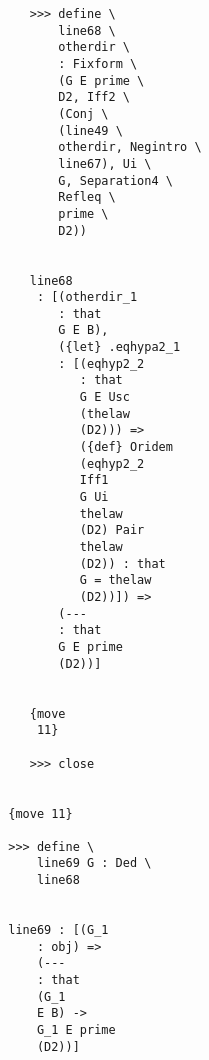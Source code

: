 \documentclass[12pt]{article}
\begin{document}
\begin{verbatim}
                                    >>> define \
                                        line68 \
                                        otherdir \
                                        : Fixform \
                                        (G E prime \
                                        D2, Iff2 \
                                        (Conj \
                                        (line49 \
                                        otherdir, Negintro \
                                        line67), Ui \
                                        G, Separation4 \
                                        Refleq \
                                        prime \
                                        D2))


                                    line68 
                                     : [(otherdir_1 
                                        : that 
                                        G E B), 
                                        ({let} .eqhypa2_1 
                                        : [(eqhyp2_2 
                                           : that 
                                           G E Usc 
                                           (thelaw 
                                           (D2))) => 
                                           ({def} Oridem 
                                           (eqhyp2_2 
                                           Iff1 
                                           G Ui 
                                           thelaw 
                                           (D2) Pair 
                                           thelaw 
                                           (D2)) : that 
                                           G = thelaw 
                                           (D2))]) => 
                                        (--- 
                                        : that 
                                        G E prime 
                                        (D2))]


                                    {move 
                                     11}

                                    >>> close


                                 {move 11}

                                 >>> define \
                                     line69 G : Ded \
                                     line68


                                 line69 : [(G_1 
                                     : obj) => 
                                     (--- 
                                     : that 
                                     (G_1 
                                     E B) -> 
                                     G_1 E prime 
                                     (D2))]



\end{verbatim}
\end{document}
